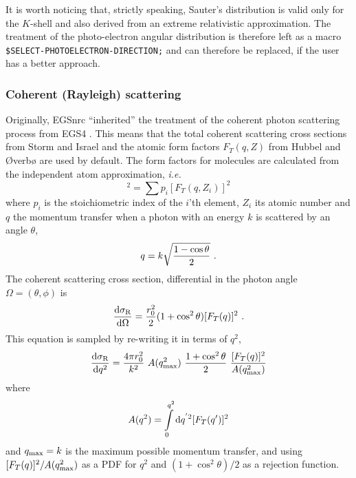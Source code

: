 It is worth noticing that, strictly speaking, Sauter's distribution is 
valid only for the $K$-shell and also derived 
from an extreme relativistic approximation. The treatment 
of the photo-electron angular distribution is therefore left 
as a macro {\tt \$SELECT-PHOTOELECTRON-DIRECTION;} 
and can therefore be replaced, if the user has a better approach.

\subsubsection{Coherent (Rayleigh) scattering}
\label{rayleigh}
\setcounter{equation}{0}

Originally, EGSnrc ``inherited'' the treatment of the coherent 
photon scattering process from EGS4 \cite{Ne85}. 
This means that the total coherent scattering cross 
sections from Storm and Israel \cite{SI70} and the atomic 
form factors $F_T(q,Z)$ from Hubbel and {\O}verb{\o} \cite{HO79} are used 
by default. 
The form factors for molecules are calculated from the independent 
atom approximation, {\em i.e.}
\begin{equation}
[F_T(q)]^2 = \sum p_i [F_T(q,Z_i)]^2
\end{equation}
where $p_i$ is the stoichiometric index of the $i$'th element,  
$Z_i$ its atomic number and $q$ the momentum transfer when 
a photon with an energy $k$ is scattered by an angle $\theta$, 
\begin{equation}
q = k \sqrt{{1 - \cos \theta \over 2}}~.
\end{equation}
The coherent scattering cross section, differential in the 
photon angle $\Omega = (\theta, \phi)$ is
\begin{equation}
{{\rm d} \sigma_{\rm R} \over {\rm d} \Omega} = {r_0^2 \over 2} 
(1 + \cos^2 \theta) [F_T(q)]^2~.
\end{equation}
This equation is sampled by re-writing it in terms of 
$q^2$,
\begin{equation}
{{\rm d} \sigma_{\rm R} \over {\rm d} q^2} = {4 \pi r_0^2 \over k^2}~
A(q_{\rm max}^2)~
{1 + \cos^2 \theta \over 2} ~{[F_T(q)]^2 \over A(q_{\rm max}^2)
}
\end{equation}
where 
\begin{equation}
A(q^2) = \int\limits_0^{q^2} {\rm d}q^{'2} [F_T(q')]^2
\end{equation}
and $q_{\rm max} = k$ is the maximum possible momentum transfer, and 
using $[F_T(q)]^2/A(q_{\rm max}^2)$  as a PDF for $q^2$ and 
$(1 + \cos^2 \theta)/2$ as a rejection function.

